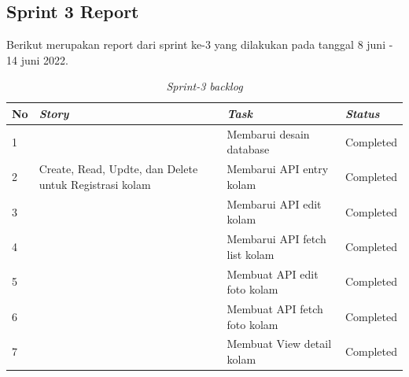 
\subsection{Sprint 3 Report}
Berikut merupakan report dari sprint ke-3 yang dilakukan pada tanggal 8 juni - 14 juni 2022.

\begin{table}[H]
	\caption{\textit{Sprint-3 backlog}}
	\label{sprint3_backlog}
	\begin{tabular}{@{} |p{0.5cm}|p{5cm}|p{5cm}|p{2cm}| @{}}
		\hline
		\textbf{No} & \textbf{\textit{Story}} & \textbf{\textit{Task}} & \textbf{\textit{Status}} \\
		\hline
		1 & \multirow{3}{5cm}{Create, Read, Updte, dan Delete untuk Registrasi kolam} & Membarui desain database  & Completed\\
		\cline{1-1}\cline{3-4}
		2 & & Membarui API entry kolam & Completed\\
		\cline{1-1}\cline{3-4}
		3 & & Membarui API edit kolam & Completed\\
		\cline{1-1}\cline{3-4}
		4 & & Membarui API fetch list kolam & Completed\\
		\cline{1-1}\cline{3-4}
		5 & & Membuat API edit foto kolam & Completed\\
		\cline{1-1}\cline{3-4}
		6 & & Membuat API fetch foto kolam & Completed\\
		\cline{1-1}\cline{3-4}
		7 & & Membuat View detail kolam & Completed\\
		\cline{1-1}\cline{3-4}
		\hline
	\end{tabular}
\end{table}

